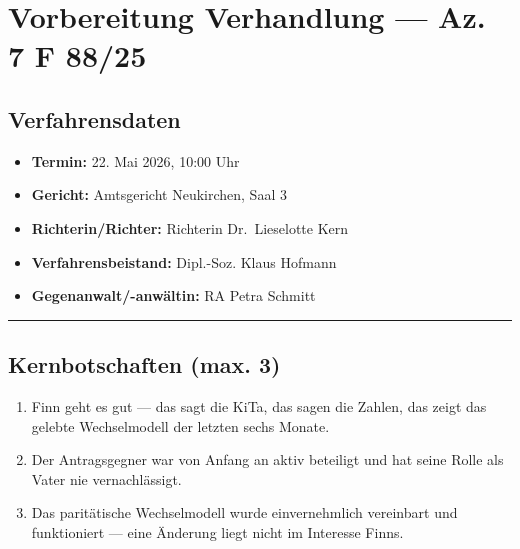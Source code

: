 \documentclass[
  11pt,
  a4paper,
]{article}
\providecommand{\tightlist}{%
  \setlength{\itemsep}{0pt}\setlength{\parskip}{0pt}}
\begin{document}

\section{Vorbereitung Verhandlung --- Az. 7 F
88/25}\label{vorbereitung-verhandlung-az.-7-f-8825}

\subsection{Verfahrensdaten}\label{verfahrensdaten}

\begin{itemize}
\tightlist
\item
  \textbf{Termin:} 22. Mai 2026, 10:00 Uhr
\item
  \textbf{Gericht:} Amtsgericht Neukirchen, Saal 3
\item
  \textbf{Richterin/Richter:} Richterin Dr.~Lieselotte Kern
\item
  \textbf{Verfahrensbeistand:} Dipl.-Soz. Klaus Hofmann
\item
  \textbf{Gegenanwalt/-anwältin:} RA Petra Schmitt
\end{itemize}

\begin{center}\rule{0.5\linewidth}{0.5pt}\end{center}

\subsection{Kernbotschaften (max. 3)}\label{kernbotschaften-max.-3}

\begin{enumerate}
\def\labelenumi{\arabic{enumi}.}
\tightlist
\item
  Finn geht es gut --- das sagt die KiTa, das sagen die Zahlen, das
  zeigt das gelebte Wechselmodell der letzten sechs Monate.
\item
  Der Antragsgegner war von Anfang an aktiv beteiligt und hat seine
  Rolle als Vater nie vernachlässigt.
\item
  Das paritätische Wechselmodell wurde einvernehmlich vereinbart und
  funktioniert --- eine Änderung liegt nicht im Interesse Finns.
\end{enumerate}
\end{document}
